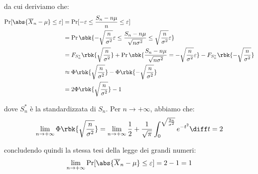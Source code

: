 \documentclass[a4paper, 12pt]{report}
\begin{document}
    da cui deriviamo che:
    \[\begin{split}
        \Pr[\abs{\overline{X}_n - \mu} \leq \varepsilon] &= \Pr[ -\varepsilon \leq \frac{S_n-n\mu}{n} \leq \varepsilon] \\
        &= \Pr\sbk{- \sqrt{\frac{n}{\sigma^2}} \varepsilon \leq \frac{S_n-n\mu}{\sqrt{n \sigma^2}} \leq \sqrt{\frac{n}{\sigma^2}} \varepsilon} \\
        &= F_{S_n^*}\rbk{\sqrt{\frac{n}{\sigma^2}}} + \Pr\sbk{\frac{S_n-n\mu}{\sqrt{n \sigma^2}} = -\sqrt{\frac{n}{\sigma^2}} \varepsilon} - F_{S_n^*}\rbk{-\sqrt{\frac{n}{\sigma^2}}} \\
        &\approx \Phi\rbk{\sqrt{\frac{n}{\sigma^2}}} - \Phi\rbk{-\sqrt{\frac{n}{\sigma^2}}} \\
        & = 2\Phi\rbk{\sqrt{\frac{n}{\sigma^2}}} - 1
    \end{split}\]

    dove $S_n^*$ è la standardizzata di $S_n$. Per $n \to +\infty$, abbiamo che:
    \[\lim_{n \to +\infty} \Phi\rbk{\sqrt{\frac{n}{\sigma^2}}} = \lim_{n \to +\infty} \frac{1}{2} + \frac{1}{\sqrt{\pi}} \int_{0}^{\sqrt{\frac{2n}{\sigma^2}}} e^{-t^2} \diff t = 2\]

    concludendo quindi la stessa tesi della legge dei grandi numeri:
    \[\lim_{n \to +\infty} \Pr[\abs{\overline{X}_n - \mu} \leq \varepsilon] = 2 - 1 = 1\]
\end{document}

